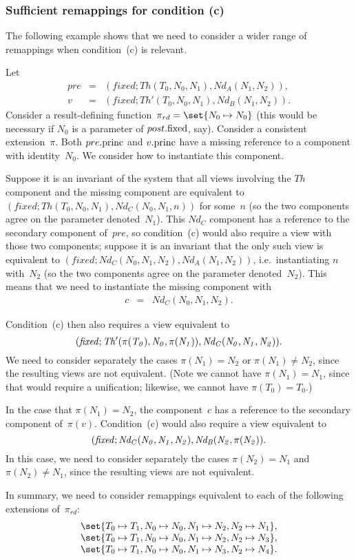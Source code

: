 \subsubsection{Sufficient remappings for condition (c)}
\label{sec:necessary-c}

The following example shows that we need to consider a wider range of
remappings when condition~(c) is relevant.
%
\begin{example}
Let 
\begin{eqnarray*}
pre & = & (fixed; Th(T_0,N_0,N_1), Nd_A(N_1,N_2)), \\
v & = & (fixed; Th'(T_0,N_0,N_1), Nd_B(N_1,N_2)).
\end{eqnarray*}
%
Consider a result-defining function~$\pi_{rd} = \set{N_0 \mapsto N_0}$ (this
would be necessary if $N_0$ is a parameter of $post.\fixed$, say).  Consider a
consistent extension~$\pi$.  Both $pre.\princ$ and $v.\princ$ have a missing
reference to a component with identity~$N_0$.  We consider how to instantiate
this component.

Suppose it is an invariant of the system that all views involving the $Th$
component and the missing component are equivalent to $(fixed;
Th(T_0,N_0,N_1), Nd_C(N_0,N_1,n))$ for some~$n$ (so the two components agree
on the parameter denoted~$N_1$).  This $Nd_C$ component has a reference to the
secondary component of~$pre$, so condition~(c) would also require a view with
those two components; suppose it is an invariant that the only such view is
equivalent to $(fixed; Nd_C(N_0,N_1,N_2), Nd_A(N_1,N_2))$, i.e.~instantiating
$n$ with~$N_2$ (so the two components agree on the parameter denoted~$N_2$).
This means that we need to instantiate the missing component with
%
\begin{eqnarray*}
c & = & Nd_C(N_0,N_1,N_2).
\end{eqnarray*}

Condition~(c) then also requires a view equivalent to
\[\mit
(fixed; Th'(\pi(T_0),N_0,\pi(N_1)), Nd_C(N_0,N_1,N_2)).
\]
We need to consider separately the cases $\pi(N_1) = N_2$ or $\pi(N_1) \ne
N_2$, since the resulting views are not equivalent.  (Note we cannot have
$\pi(N_1) = N_1$, since that would require a unification; likewise, we cannot
have $\pi(T_0) = T_0$.)

In the case that $\pi(N_1) = N_2$, the component~$c$ has a reference to the
secondary component of~$\pi(v)$.  Condition~(c) would also require a view
equivalent to
\[\mit
(fixed; Nd_C(N_0,N_1,N_2), Nd_B(N_2, \pi(N_2)).
\]
In this case, we need to consider separately the cases  $\pi(N_2) = N_1$ and
$\pi(N_2) \ne N_1$, since the resulting views are not equivalent.

In summary, we need to consider remappings equivalent to each of the following
extensions of~$\pi_{rd}$:
\[
\begin{array}{c}
\set{T_0 \mapsto T_1, N_0 \mapsto N_0, N_1 \mapsto N_2, N_2 \mapsto N_1}, \\
\set{T_0 \mapsto T_1, N_0 \mapsto N_0, N_1 \mapsto N_2, N_2 \mapsto N_3}, \\
\set{T_0 \mapsto T_1, N_0 \mapsto N_0, N_1 \mapsto N_3, N_2 \mapsto N_4}.
\end{array}
\]
\end{example}

